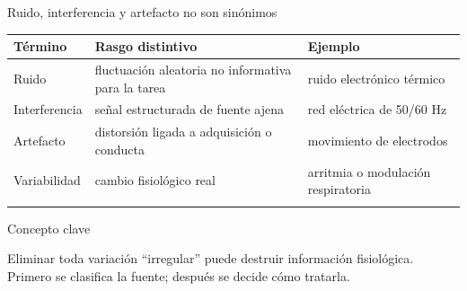 \documentclass[
  10pt,
  ignorenonframetext,
  aspectratio=169,
  spanish,
]{beamer}
\begin{document}
\begin{frame}{Ruido, interferencia y artefacto no son sinónimos}
\label{d1-020}
\begin{longtable}[]{@{}
  >{\raggedright\arraybackslash}p{}
  >{\raggedright\arraybackslash}p{}
  >{\raggedright\arraybackslash}p{}@{}}
\toprule\noalign{}
\begin{minipage}[b]{\linewidth}\raggedright
Término
\end{minipage} & \begin{minipage}[b]{\linewidth}\raggedright
Rasgo distintivo
\end{minipage} & \begin{minipage}[b]{\linewidth}\raggedright
Ejemplo
\end{minipage} \\
\midrule\noalign{}
\endhead
Ruido & fluctuación aleatoria no informativa para la tarea & ruido
electrónico térmico \\
Interferencia & señal estructurada de fuente ajena & red eléctrica de
50/60 Hz \\
Artefacto & distorsión ligada a adquisición o conducta & movimiento de
electrodos \\
Variabilidad & cambio fisiológico real & arritmia o modulación
respiratoria \\
\bottomrule\noalign{}
\end{longtable}

\begin{block}{Concepto clave}

Eliminar toda variación ``irregular'' puede destruir información
fisiológica. Primero se clasifica la fuente; después se decide cómo
tratarla.

\end{block}

\end{frame}
\end{document}
